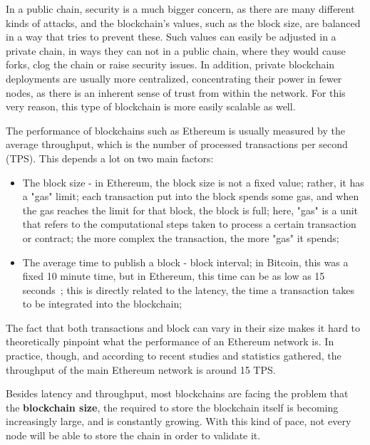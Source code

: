 In a public chain, security is a much bigger concern, as there are many different kinds of attacks, and the blockchain's values, such as the block size, are balanced in a way that tries to prevent these. Such values can easily be adjusted in a private chain, in ways they can not in a public chain, where they would cause forks, clog the chain or raise security issues. In addition, private blockchain deployments are usually more centralized, concentrating their power in fewer nodes, as there is an inherent sense of trust from within the network. For this very reason, this type of blockchain is more easily scalable as well.



The performance of blockchains such as Ethereum is usually measured by the average throughput, which is the number of processed transactions per second (TPS). This depends a lot on two main factors:
\begin{itemize}
\item The block size - in Ethereum, the block size is not a fixed value; rather, it has a "gas" limit; each transaction put into the block spends some gas, and when the gas reaches the limit for that block, the block is full; here, "gas" is a unit that refers to the computational steps taken to process a certain transaction or contract; the more complex the transaction, the more "gas" it spends;
\item The average time to publish a block - block interval; in Bitcoin, this was a fixed 10 minute time, but in Ethereum, this time can be as low as 15 seconds~\cite{Scherer2017}; this is directly related to the latency, the time a transaction takes to be integrated into the blockchain;
\end{itemize}

The fact that both transactions and block can vary in their size makes it hard to theoretically pinpoint what the performance of an Ethereum network is. In practice, though, and according to recent studies and statistics gathered, the throughput of the main Ethereum network is around 15 TPS. %

Besides latency and throughput, most blockchains are facing the problem that the \textbf{blockchain size}, the required to store the blockchain itself is becoming increasingly large, and is constantly growing. With this kind of pace, not every node will be able to store the chain in order to validate it.

